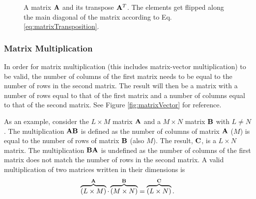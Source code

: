\begin{figure}[h]
    \centering
    \hspace{0.03cm}
    \caption{A matrix $\mathbf{A}$ and its transpose $\mathbf{A}^T$. The elements get flipped along the main diagonal of the matrix according to Eq. \eqref{eq:matrixTransposition}. \label{fig:matrixTransp}}
\end{figure}

\subsubsection{Matrix Multiplication}
In order for matrix multiplication (this includes matrix-vector multiplication) to be valid, the number of columns of the first matrix needs to be equal to the number of rows in the second matrix. The result will then be a matrix with a number of rows equal to that of the first matrix and a number of columns equal to that of the second matrix. See Figure \ref{fig:matrixVector} for reference.

As an example, consider the $L\times M$ matrix $
\mathbf{A}$ and a $M\times N$ matrix $\mathbf{B}$ with $L\neq N$. The multiplication $\mathbf{A}\mathbf{B}$ is defined as the number of columns of matrix $\mathbf{A}$ ($M$) is equal to the number of rows of matrix $\mathbf{B}$ (also $M$). The result, $\mathbf{C}$, is a $L \times N$ matrix. The multiplication $\mathbf{B}\mathbf{A}$ is undefined as the number of columns of the first matrix does not match the number of rows in the second matrix. A valid multiplication of two matrices written in their dimensions is
\begin{equation}
    \overbrace{(L\times M)}^{\mathbf{A}}\cdot \overbrace{(M\times N)}^{\mathbf{B}} = \overbrace{(L
    \times N)}^{\mathbf{C}}.
\end{equation}

